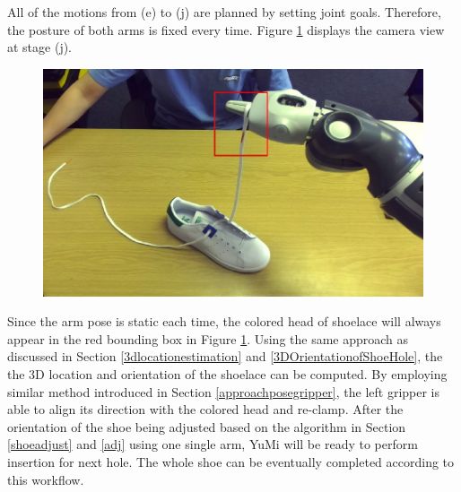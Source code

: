 All of the motions from (e) to (j) are planned by setting joint goals. Therefore, the posture of both arms is fixed every time. Figure \ref{3dlace} displays the camera view at stage (j).



\begin{figure}[H]
\centering
\includegraphics[width = 0.6\columnwidth]{Implementation/mp/3dlace.jpg}
\caption{}
\label{3dlace}
\end{figure}

Since the arm pose is static each time, the colored head of shoelace will always appear in the red bounding box in Figure \ref{3dlace}. Using the same approach as discussed in Section \ref{3dlocationestimation} and \ref{3DOrientationofShoeHole}, the the 3D location and orientation of the shoelace can be computed. By employing similar method introduced in Section \ref{approachposegripper}, the left gripper is able to align its direction with the colored head and re-clamp. After the orientation of the shoe being adjusted based on the algorithm in Section \ref{shoeadjust} and \ref{adj} using one single arm, YuMi will be ready to perform insertion for next hole. The whole shoe can be eventually completed according to this workflow.